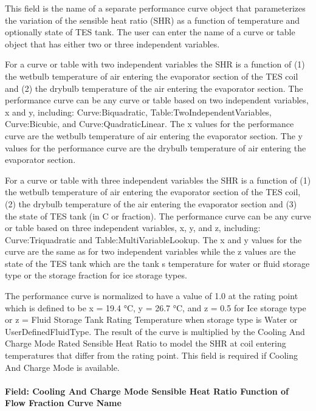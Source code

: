 This field is the name of a separate performance curve object that parameterizes the variation of the sensible heat ratio (SHR) as a function of temperature and optionally state of TES tank. The user can enter the name of a curve or table object that has either two or three independent variables.

For a curve or table with two independent variables the SHR is a function of (1) the wetbulb temperature of air entering the evaporator section of the TES coil and (2) the drybulb temperature of the air entering the evaporator section. The performance curve can be any curve or table based on two independent variables, x and y, including: Curve:Biquadratic, Table:TwoIndependentVariables, Curve:Bicubic, and Curve:QuadraticLinear. The x values for the performance curve are the wetbulb temperature of air entering the evaporator section. The y values for the performance curve are the drybulb temperature of air entering the evaporator section.

For a curve or table with three independent variables the SHR is a function of (1) the wetbulb temperature of air entering the evaporator section of the TES coil, (2) the drybulb temperature of the air entering the evaporator section and (3) the state of TES tank (in C or fraction). The performance curve can be any curve or table based on three independent variables, x, y, and z, including: Curve:Triquadratic and Table:MultiVariableLookup. The x and y values for the curve are the same as for two independent variables while the z values are the state of the TES tank which are the tank s temperature for water or fluid storage type or the storage fraction for ice storage types.

The performance curve is normalized to have a value of 1.0 at the rating point which is defined to be x = 19.4 °C, y = 26.7 °C, and z = 0.5 for Ice storage type or z = Fluid Storage Tank Rating Temperature when storage type is Water or UserDefinedFluidType. The result of the curve is multiplied by the Cooling And Charge Mode Rated Sensible Heat Ratio to model the SHR at coil entering temperatures that differ from the rating point. This field is required if Cooling And Charge Mode is available.

\paragraph{Field: Cooling And Charge Mode Sensible Heat Ratio Function of Flow Fraction Curve Name}\label{field-cooling-and-charge-mode-sensible-heat-ratio-function-of-flow-fraction-curve-name}

